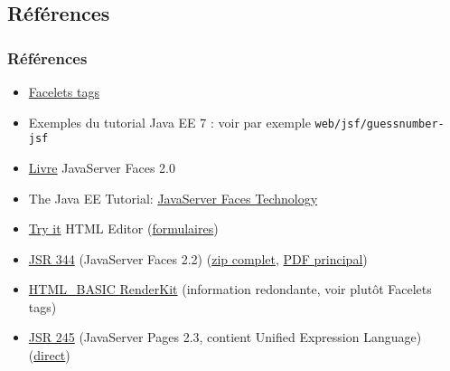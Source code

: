 \documentclass[english, french]{beamer}
\begin{document}
\subsection{Références}
\begin{frame}
	\frametitle{Références}
	\begin{itemize}
		\item \href{https://docs.oracle.com/javaee/7/javaserver-faces-2-2/vdldocs-facelets/toc.htm}{Facelets tags}
		\item Exemples du tutorial Java EE 7 : voir par exemple \texttt{web/jsf/guessnumber-jsf}
		\item \href{http://gen.lib.rus.ec/book/index.php?md5=DED75FBAF79F19E9473C4EDF96EC9B57}{Livre} JavaServer Faces 2.0
		\item The Java EE Tutorial: \href{https://docs.oracle.com/javaee/7/tutorial/jsf-intro.htm}{JavaServer Faces Technology}
		\item \href{http://www.w3schools.com/tags/tryit.asp?filename=tryhtml_basic}{Try it} HTML Editor (\href{http://www.w3schools.com/tags/tryit.asp?filename=tryhtml_form_method}{formulaires})
		\item \href{https://jcp.org/en/jsr/detail?id=344}{JSR 344} (JavaServer Faces 2.2) (\href{http://download.oracle.com/otn-pub/jcp/jsf-2_2-fr-eval-spec/javax.faces-api-2.2-FINAL.zip}{zip complet}, \href{http://www.sws.bfh.ch/~fischli/courses/eadj/jsf/doc/JSF_20130320.pdf}{PDF principal})
		\item \href{https://docs.oracle.com/javaee/7/javaserver-faces-2-2/renderkitdocs/toc.htm}{HTML\_BASIC RenderKit} (information redondante, voir plutôt Facelets tags)
		\item \href{https://jcp.org/en/jsr/detail?id=245}{JSR 245} (JavaServer Pages 2.3, contient Unified Expression Language) (\href{http://download.oracle.com/otn-pub/jcp/jsp-2_3-mrel2-eval-spec/JSP2.3MR.pdf}{direct})
	\end{itemize}
\end{frame}
\end{document}
